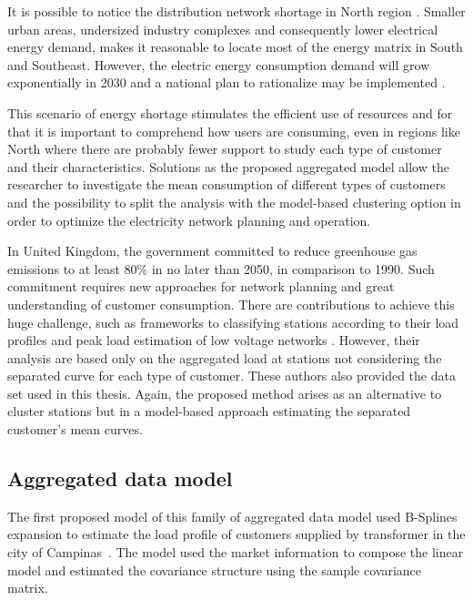 It is possible to notice the distribution network shortage in North region \cite{nobre2019solar}. Smaller urban areas, undersized industry complexes and consequently lower electrical energy demand, makes it reasonable to locate most of the energy matrix in South and Southeast. However, the electric energy consumption demand will grow exponentially in 2030 and a national plan to rationalize may be implemented \cite{PNE2030}. 

This scenario of energy shortage stimulates the efficient use of resources and for that it is important to comprehend how users are consuming, even in regions like North where there are probably fewer support to study each type of customer and their characteristics. Solutions as the proposed aggregated model allow the researcher to investigate the mean consumption of different types of customers and the possibility to split the analysis with the model-based clustering option in order to optimize the electricity network planning and operation.

In United Kingdom, the government committed to reduce greenhouse gas emissions to at least 80\% in no later than 2050, in comparison to 1990. Such commitment requires new approaches for network planning and great understanding of customer consumption. There are contributions to achieve this huge challenge, such as frameworks to classifying stations according to their load profiles and peak load estimation of low voltage networks \cite{li2015development1,li2015development2}. However, their analysis are based only on the aggregated load at stations not considering the separated curve for each type of customer. These authors also provided the data set used in this thesis. Again, the proposed method arises as an alternative to cluster stations but in a model-based approach estimating the separated customer's mean curves.


\subsection{Aggregated data model}
\label{sec:aggrIntro}

The first proposed model of this family of aggregated data model used B-Splines expansion to estimate the load profile of customers supplied by transformer in the city of Campinas~\cite{dias2009non}. The model used the market information to compose the linear model and estimated the covariance structure using the sample covariance matrix.


